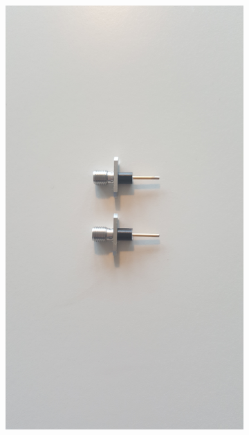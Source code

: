 \documentclass[main.tex]{subfiles}
\begin{document}
\begin{figure}[h]
\begin{subfigure}{0.329\textwidth}
        \includegraphics[angle=-90,trim=1450 100 1550 100,clip,width=0.97\linewidth]{figure/Filterbilder/u_sma_skalning.jpg} 
        \caption{}
        \label{fig:u_SMA_skalning}
    \end{subfigure}
        \begin{subfigure}{0.329\textwidth}
        \centering

\end{subfigure}
\end{figure}
\end{document}
